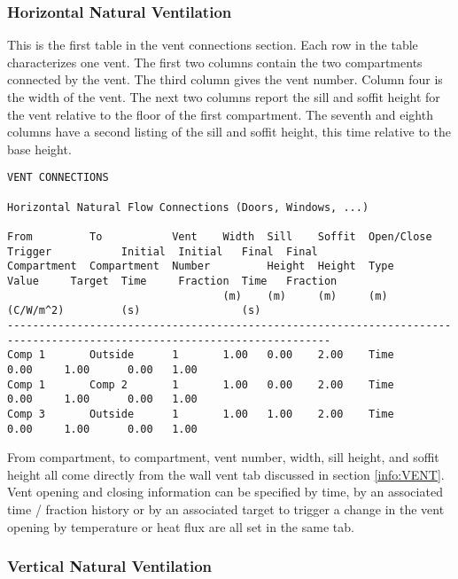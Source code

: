 \subsubsection{Horizontal Natural Ventilation}
This is the first table in the vent connections section.  Each row in the table characterizes one vent.  The first two columns contain the two compartments connected by the vent. The third column gives the vent number.  Column four is the width of the vent.  The next two columns report the sill and soffit height for the vent relative to the floor of the first compartment.  The seventh and eighth columns have a second listing of the sill and soffit height, this time relative to the base height.

\begin{lstlisting}[basicstyle=\tiny]
VENT CONNECTIONS

Horizontal Natural Flow Connections (Doors, Windows, ...)

From         To           Vent    Width  Sill    Soffit  Open/Close  Trigger           Initial  Initial   Final  Final
Compartment  Compartment  Number         Height  Height  Type        Value     Target  Time     Fraction  Time   Fraction
                                  (m)    (m)     (m)     (m)         (C/W/m^2)         (s)                (s)
-------------------------------------------------------------------------------------------------------------------------
Comp 1       Outside      1       1.00   0.00    2.00    Time                          0.00     1.00      0.00   1.00
Comp 1       Comp 2       1       1.00   0.00    2.00    Time                          0.00     1.00      0.00   1.00
Comp 3       Outside      1       1.00   1.00    2.00    Time                          0.00     1.00      0.00   1.00
\end{lstlisting}
From compartment, to compartment, vent number, width, sill height, and soffit height all come directly from the wall vent tab discussed in section \ref{info:VENT}. Vent opening and closing information can be specified by time, by an associated time / fraction history or by an associated target to trigger a change in the vent opening by temperature or heat flux are all set in the same tab.

\subsubsection{Vertical Natural Ventilation}

